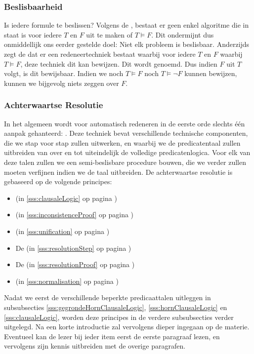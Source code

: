 \subsubsection{Beslisbaarheid}
Is iedere formule te beslissen? Volgens de , bestaat er geen enkel algoritme die in staat is voor iedere $T$ en $F$ uit te maken of $T\vDash F$. Dit ondermijnt dus onmiddellijk ons eerder gestelde doel: Niet elk probleem is beslisbaar. Anderzijds zegt de  dat er een redeneertechniek bestaat waarbij voor iedere $T$ en $F$ waarbij $T\vDash F$, deze techniek dit kan bewijzen. Dit wordt  genoemd. Dus indien $F$ uit $T$ volgt, is dit bewijsbaar. Indien we noch $T\vDash F$ noch $T\vDash \neg F$ kunnen bewijzen, kunnen we bijgevolg niets zeggen over $F$.
\subsubsection{Achterwaartse Resolutie}
In het algemeen wordt voor automatisch redeneren in de eerste orde slechts \'e\'en aanpak gehanteerd: . Deze techniek bevat verschillende technische componenten, die we stap voor stap zullen uitwerken, en waarbij we de predicatentaal zullen uitbreiden van  over  en  tot uiteindelijk de volledige predicatenlogica. Voor elk van deze talen zullen we een semi-beslisbare procedure bouwen, die we verder zullen moeten verfijnen indien we de taal uitbreiden. De achterwaartse resolutie is gebaseerd op de volgende principes:
\begin{itemize}
 \item {} (in \ref{sss:clausaleLogic} op pagina \pageref{sss:clausaleLogic})
 \item {} (in \ref{sss:inconsistenceProof} op pagina \pageref{sss:inconsistenceProof})
 \item {} (in \ref{sss:unification} op pagina \pageref{sss:unification})
 \item De  (in \ref{sss:resolutionStep} op pagina \pageref{sss:resolutionStep})
 \item De  (in \ref{sss:resolutionProof} op pagina \pageref{sss:resolutionProof})
 \item {} (in \ref{sss:normalisation} op pagina \pageref{sss:normalisation})
\end{itemize}
Nadat we eerst de verschillende beperkte predicaattalen uitleggen in subsubsecties \ref{sss:gegrondeHornClausaleLogic}, \ref{sss:hornClausaleLogic} en \ref{sss:clausaleLogic}, worden
deze principes in de  verdere subsubsecties verder uitgelegd. Na een korte introductie zal vervolgens dieper ingegaan op de materie. Eventueel kan de lezer bij ieder item eerst de eerste paragraaf lezen, en vervolgens zijn kennis uitbreiden met de overige paragrafen.
